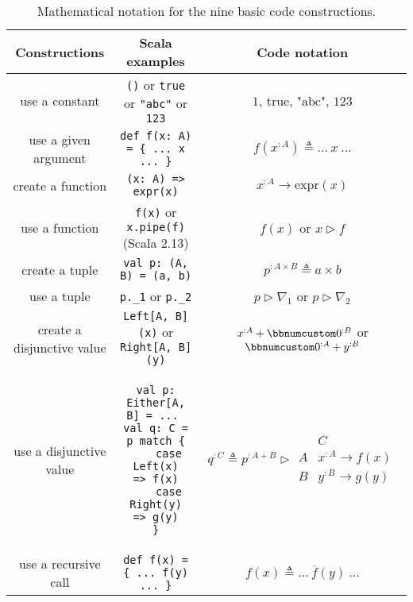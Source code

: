 \begin{table}
\begin{centering}
\begin{tabular}{|c|c|c|}
\hline 
\textbf{\small{}Constructions} & \textbf{\small{}Scala examples} & \textbf{\small{}Code notation}\tabularnewline
\hline 
\hline 
{\small{}use a constant} & {\small{}}\lstinline!()!{\small{} or }\lstinline!true!{\small{}
or }\lstinline!"abc"!{\small{} or }\lstinline!123! & {\small{}$1$, $\text{true}$, $\text{"abc"}$, $123$}\tabularnewline
\hline 
{\small{}use a given argument} & {\small{}}\lstinline!def f(x: A) = { ... x ... }! & {\small{}$f(x^{:A})\triangleq...~x~...$}\tabularnewline
\hline 
{\small{}create a function} & {\small{}}\lstinline!(x: A) => expr(x)! & {\small{}$x^{:A}\rightarrow\text{expr}(x)$}\tabularnewline
\hline 
{\small{}use a function} & {\small{}}\lstinline!f(x)!{\small{} or }\lstinline!x.pipe(f)!{\small{}
(Scala 2.13)} & {\small{}$f(x)$ or $x\triangleright f$}\tabularnewline
\hline 
{\small{}create a tuple} & {\small{}}\lstinline!val p: (A, B) = (a, b)! & {\small{}$p^{:A\times B}\triangleq a\times b$}\tabularnewline
\hline 
{\small{}use a tuple} & {\small{}}\lstinline!p._1!{\small{} or }\lstinline!p._2! & {\small{}$p\triangleright\nabla_{1}$ or $p\triangleright\nabla_{2}$}\tabularnewline
\hline 
{\small{}create a disjunctive value} & {\small{}}\lstinline!Left[A, B](x)!{\small{} or }\lstinline!Right[A, B](y)! & {\small{}$x^{:A}+\bbnum 0^{:B}$ or $\bbnum 0^{:A}+y^{:B}$}\tabularnewline
\hline 
{\small{}use a disjunctive value} & {\small{}\hspace*{-0.013\linewidth}}%
\begin{minipage}[c][1\totalheight][b]{0.33\columnwidth}%
{\small{}\vspace{0.14\baselineskip}
}
\begin{lstlisting}
val p: Either[A, B] = ... 
val q: C = p match {
    case Left(x)   => f(x)
    case Right(y)  => g(y)
}
\end{lstlisting}
{\small{}\vspace{-0.1\baselineskip}
}%
\end{minipage}{\small{} \hspace*{-0.009\linewidth}} & {\small{}$q^{:C}\triangleq p^{:A+B}\triangleright\begin{array}{|c||c|}
 & C\\
\hline A & x^{:A}\rightarrow f(x)\\
B & y^{:B}\rightarrow g(y)
\end{array}$}\tabularnewline
\hline 
{\small{}use a recursive call} & {\small{}}\lstinline!def f(x) = { ... f(y) ... }! & {\small{}$f(x)\triangleq...~\overline{f}(y)~...$}\tabularnewline
\hline 
\end{tabular}
\par\end{centering}
\caption{Mathematical notation for the nine basic code constructions.\label{tab:Mathematical-notation-for-basic-code-constructions}}
\end{table}


